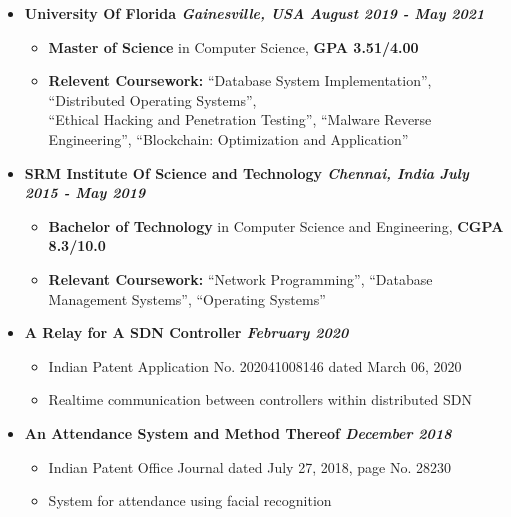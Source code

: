 \documentclass[9]{Resume}
\begin{document}
\begin{itemize}[noitemsep,nolistsep]
    \item[]\textbf{University Of Florida \textit{{\scriptsize Gainesville, USA}} \hfill \textit{August 2019 - May 2021}}
        \begin{itemize}[leftmargin=*]
            \setlength\itemsep{-0.25em}
            \item[\textbullet]{\footnotesize \textbf{Master of Science} in Computer Science, \textbf{GPA 3.51/4.00}}
            \item[\textbullet]{\footnotesize \textbf{Relevent Coursework:}
                ``Database System Implementation'', ``Distributed Operating Systems'',\\
                ``Ethical Hacking and Penetration Testing'', ``Malware Reverse Engineering'',
                ``Blockchain: Optimization and Application''}
        \end{itemize}
    \item[]\textbf{SRM Institute Of Science and Technology \textit{{\scriptsize Chennai, India}} \hfill \textit{July 2015 - May 2019}}
        \begin{itemize}[leftmargin=*]
            \setlength\itemsep{-0.25em}
            \item[\textbullet]{\footnotesize \textbf{Bachelor of Technology} in Computer Science and Engineering, \textbf{CGPA 8.3/10.0}}
            \item[\textbullet]{\footnotesize \textbf{Relevant Coursework:}
                                        ``Network Programming'', ``Database Management Systems'', ``Operating Systems''}
        \end{itemize}
\end{itemize}

\begin{itemize}[noitemsep,nolistsep]
    \item[]\textbf{A Relay for A SDN Controller \hfill \textit{February 2020}}
        \begin{itemize}[leftmargin=*]
            \setlength\itemsep{-0.25em}
            \item[\textbullet]Indian Patent Application No. 202041008146 dated March 06, 2020
            \item[\textbullet]Realtime communication between controllers within distributed SDN
        \end{itemize}
    \item[]\textbf{An Attendance System and Method Thereof \hfill \textit{December 2018}}
        \begin{itemize}[leftmargin=*]
            \setlength\itemsep{-0.25em}
            \item[\textbullet]Indian Patent Office Journal dated July 27, 2018, page No. 28230
            \item[\textbullet]System for attendance using facial recognition
        \end{itemize}
\end{itemize}
\end{document}
